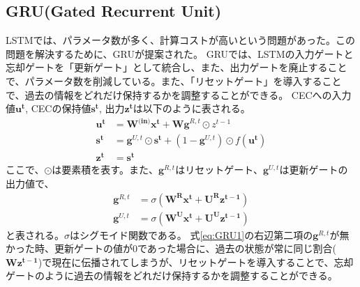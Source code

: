 \documentclass{ltjsarticle}
\begin{document}
\newpage

\subsection{GRU(Gated Recurrent Unit)}
LSTMでは、パラメータ数が多く、計算コストが高いという問題があった。この問題を解決するために、GRUが提案された。
GRUでは、LSTMの入力ゲートと忘却ゲートを「更新ゲート」として統合し、また、出力ゲートを廃止することで、パラメータ数を削減している。また、「リセットゲート」を導入することで、過去の情報をどれだけ保持するかを調整することができる。
CECへの入力値$\mathbf{u^t}$, CECの保持値$\mathbf{s^{t}}$, 出力$\mathbf{z^t}$は以下のように表される。
\begin{align}
  \label{eq:GRU1}
  \mathbf{u^t} &=\mathbf{W^{\text{(in)}}}\mathbf{x^t} + \mathbf{Wg}^{R,t} \odot z^{t-1}\\
  \mathbf{s^t} &= \mathbf{g}^{U,t} \odot \mathbf{s^t} + (1 - \mathbf{g}^{U,t}) \odot f(\mathbf{u^t})\\
  \mathbf{z^t} &= \mathbf{s^t}
\end{align}
ここで、$\odot$は要素積を表す。また、$\mathbf{g}^{R,t}$はリセットゲート、$\mathbf{g}^{U,t}$は更新ゲートの出力値で、
\begin{align}
  \mathbf{g}^{R,t} &= \sigma(\mathbf{W^R}\mathbf{x^t} + \mathbf{U^R}\mathbf{z^{t-1}})\\
  \mathbf{g}^{U,t} &= \sigma(\mathbf{W^U}\mathbf{x^t} + \mathbf{U^U}\mathbf{z^{t-1}})
\end{align}
と表される。$\sigma$はシグモイド関数である。
式\eqref{eq:GRU1}の右辺第二項の$\mathbf{g}^{R,t}$が無かった時、更新ゲートの値が0であった場合に、過去の状態が常に同じ割合($\mathbf{Wz^{t-1}}$)で現在に伝播されてしまうが、リセットゲートを導入することで、忘却ゲートのように過去の情報をどれだけ保持するかを調整することができる。
\end{document}
